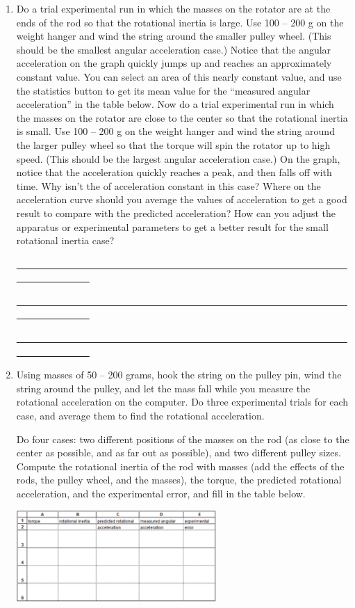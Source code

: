 \begin{enumerate}[label=\arabic*.]
\item Do a trial experimental run in which the masses on the rotator are at the ends of the rod so that the rotational inertia is large.  Use 100 -- 200 g on the weight hanger and wind the string around the smaller pulley wheel.  (This should be the smallest angular acceleration case.)  Notice that the angular acceleration on the graph quickly jumps up and reaches an approximately constant value.  You can select an area of this nearly constant value, and use the statistics button to get its mean value for the ``measured angular acceleration'' in the table below.  Now do a trial experimental run in which the masses on the rotator are close to the center so that the rotational inertia is small.  Use 100 -- 200 g on the weight hanger and wind the string around the larger pulley wheel so that the torque will spin the rotator up to high speed.  (This should be the largest angular acceleration case.)  On the graph, notice that the acceleration quickly reaches a peak, and then falls off with time.  Why isn't the of acceleration constant in this case?  Where on the acceleration curve should you average the values of acceleration to get a good result to compare with the predicted acceleration?  How can you adjust the apparatus or experimental parameters to get a better result for the small rotational inertia case?

\ul{~~~~~~~~~~~~~~~~~~~~~~~~~~~~~~~~~~~~~~~~~~~~~~~~~~~~~~~~~~~~~~~~~~~~~~~~~~~~~~~~~~~}

\ul{~~~~~~~~~~~~~~~~~~~~~~~~~~~~~~~~~~~~~~~~~~~~~~~~~~~~~~~~~~~~~~~~~~~~~~~~~~~~~~~~~~~}

\ul{~~~~~~~~~~~~~~~~~~~~~~~~~~~~~~~~~~~~~~~~~~~~~~~~~~~~~~~~~~~~~~~~~~~~~~~~~~~~~~~~~~~}

\item Using masses of 50 -- 200 grams, hook the string on the pulley pin, wind the string around the pulley, and let the mass fall while you measure the rotational acceleration on the computer.  Do three experimental trials for each case, and average them to find the rotational acceleration.

Do four cases: two different positions of the masses on the rod (as close to the center as possible, and as far out as possible), and two different pulley sizes.  Compute the rotational inertia of the rod with masses (add the effects of the rods, the pulley wheel, and the masses), the torque, the predicted rotational acceleration, and the experimental error, and fill in the table below.
\begin{center} \includegraphics*[width=0.6\textwidth]{imgs/6labs/6Alab/6Aexp7/6A-exp7_fig11_sm2.png} \end{center}


\end{enumerate}
